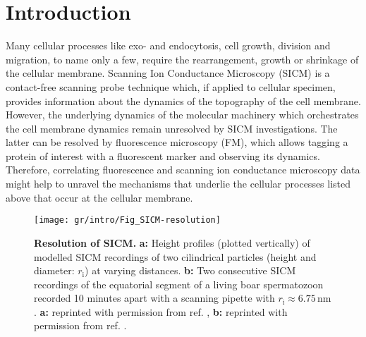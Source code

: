 \section{Introduction}
\label{sec:introduction}
Many cellular processes like exo- and endocytosis, cell growth, division and
migration, to name only a few, require the rearrangement, growth or shrinkage
of the cellular membrane. Scanning Ion Conductance Microscopy (SICM)
\cite{Hansma1989} is a contact-free scanning probe technique which, if applied
to cellular specimen, provides information about the dynamics of the
topography of the cell membrane. However, the underlying dynamics of the
molecular machinery which orchestrates the cell membrane dynamics remain
unresolved by SICM investigations. The latter can be resolved by fluorescence
microscopy (FM), which allows tagging a protein of interest with a fluorescent
marker and observing its dynamics. Therefore, correlating fluorescence and
scanning ion conductance microscopy data might help to unravel the mechanisms
that underlie the cellular processes listed above that occur at the cellular
membrane.

\begin{figure}
  \sidecaption[t]
  \texttt{[image: gr/intro/Fig\_SICM-resolution]}
  \caption{\textbf{Resolution of SICM.} \textbf{a:} Height profiles (plotted
    vertically) of modelled SICM recordings of two cilindrical particles
    (height and diameter: $r_\text{i}$) at varying distances. \textbf{b:} Two
    consecutive SICM recordings of the equatorial segment of a living boar
    spermatozoon recorded 10 minutes apart with a scanning pipette with
    $r_\mathrm{i} \approx 6.75\,\text{nm}$. \textbf{a:} reprinted with
    permission from ref. \cite{rheinlaender:094905}, \textbf{b:} reprinted
    with permission from ref. \cite{Shevchuk2006}. 
  }
  \label{fig:sicm-resolution}
\end{figure}
  
